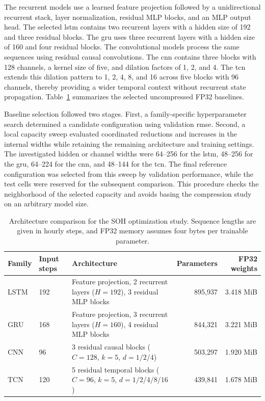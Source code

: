 \documentclass[final,3p,times]{elsarticle}
\begin{document}
The recurrent models use a learned feature projection followed by a unidirectional recurrent stack, layer normalization, residual MLP blocks, and an MLP output head. The selected \ac{lstm} contains two recurrent layers with a hidden size of 192 and three residual blocks. The \ac{gru} uses three recurrent layers with a hidden size of 160 and four residual blocks. The convolutional models process the same sequences using residual causal convolutions. The \ac{cnn} contains three blocks with 128 channels, a kernel size of five, and dilation factors of 1, 2, and 4. The \ac{tcn} extends this dilation pattern to 1, 2, 4, 8, and 16 across five blocks with 96 channels, thereby providing a wider temporal context without recurrent state propagation. Table~\ref{tab:arch_portfolio} summarizes the selected uncompressed FP32 baselines.

Baseline selection followed two stages. First, a family-specific hyperparameter search determined a candidate configuration using validation \ac{rmse}. Second, a local capacity sweep evaluated coordinated reductions and increases in the internal widths while retaining the remaining architecture and training settings. The investigated hidden or channel widths were 64--256 for the \ac{lstm}, 48--256 for the \ac{gru}, 64--224 for the \ac{cnn}, and 48--144 for the \ac{tcn}. The final reference configuration was selected from this sweep by validation performance, while the test cells were reserved for the subsequent comparison. This procedure checks the neighborhood of the selected capacity and avoids basing the compression study on an arbitrary model size.

\begin{table}[t]
\centering
\caption{Architecture comparison for the SOH optimization study. Sequence lengths are given in hourly steps, and FP32 memory assumes four bytes per trainable parameter.}
\label{tab:arch_portfolio}
\small
\begin{tabular}{llp{7.0cm}rr}
\toprule
Family & Input steps & Architecture & Parameters & FP32 weights \\
\midrule
LSTM & 192 & Feature projection, 2 recurrent layers ($H=192$), 3 residual MLP blocks & 895,937 & 3.418 MiB \\
GRU  & 168 & Feature projection, 3 recurrent layers ($H=160$), 4 residual MLP blocks & 844,321 & 3.221 MiB \\
CNN  & 96  & 3 residual causal blocks ($C=128$, $k=5$, $d=1/2/4$) & 503,297 & 1.920 MiB \\
TCN  & 120 & 5 residual temporal blocks ($C=96$, $k=5$, $d=1/2/4/8/16$) & 439,841 & 1.678 MiB \\
\bottomrule
\end{tabular}
\end{table}
\end{document}
